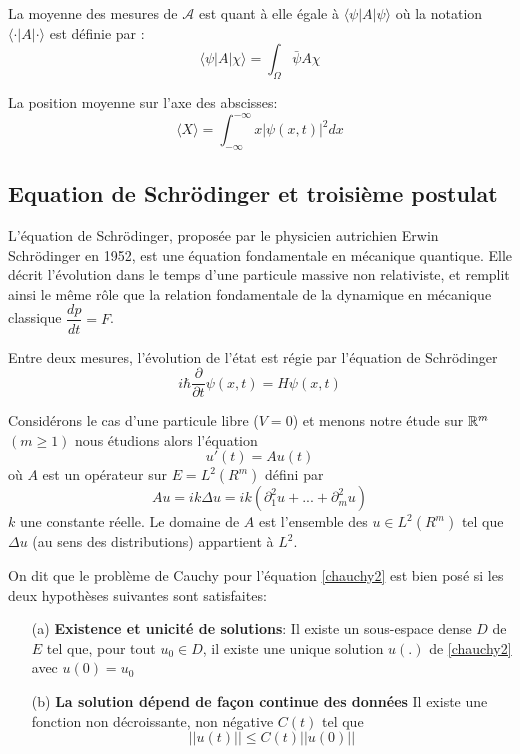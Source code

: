 La moyenne des mesures de $\mathcal{A}$ est quant à elle égale à $\langle\psi|A|\psi\rangle$ où la notation $\langle\cdot|A|\cdot\rangle$ est définie par :
\begin{equation}
\langle\psi|A|\chi\rangle = \int_{\Omega} \bar{\psi}A\chi
\end{equation}
\begin{ex}
	La position moyenne sur l’axe des abscisses:
	\begin{equation*}
	\langle X \rangle = \int_{- \infty}^{- \infty} x |\psi(x,t)|^2 dx
	\end{equation*}
\end{ex}

\subsection{Equation de Schrödinger et troisième postulat}
L'équation de Schrödinger, proposée par le physicien autrichien Erwin Schrödinger en 1952, est une équation fondamentale en mécanique quantique. Elle décrit l'évolution dans le temps d’une particule massive non relativiste, et remplit ainsi le même rôle que la relation fondamentale de la dynamique en mécanique classique $\dfrac{dp}{dt}=F$.
\begin{Post}
	Entre deux mesures, l’évolution de l’état est régie par l’équation de Schrödinger
	\begin{equation} \label{sch1}
	i\hbar \dfrac{\partial }{\partial t} \psi (x,t) = H\psi (x,t)
	\end{equation}
\end{Post}
Considérons le cas d'une particule libre ($V=0$) et menons notre étude sur $\mathbb R^m$ $(m \geq 1)$ nous étudions alors l'équation
\begin{equation} \label{chauchy2}
u'(t)=Au(t)
\end{equation}
où $A$ est un opérateur sur $E=L^2(R^m)$ défini par 
$$
Au=ik\Delta u=ik(\partial_{1}^2u+...+\partial_{m}^2u)
$$
$k$ une constante réelle. Le domaine de $A$ est l'ensemble des $u \in L^2(R^m)$ tel que $\Delta u$ (au sens des distributions) appartient à $L^2$.
\begin{definition}
	On dit que le problème de Cauchy pour l'équation \eqref{chauchy2} est bien posé si les deux hypothèses suivantes sont satisfaites:
	\begin{enumerate}
		\item[(a)] \textbf{Existence et unicité de solutions}: Il existe un sous-espace dense $D$ de $E$ tel que, pour tout $u_0 \in D$, il existe une unique solution $u(.)$ de \eqref{chauchy2} avec $u(0)=u_0$
		\item[(b)] \textbf{La solution dépend de façon continue des données} Il existe une fonction non décroissante, non négative $C(t)$ tel que
		$$
		||u(t)||\leq C(t) ||u(0)||
		$$
	\end{enumerate}
\end{definition}
